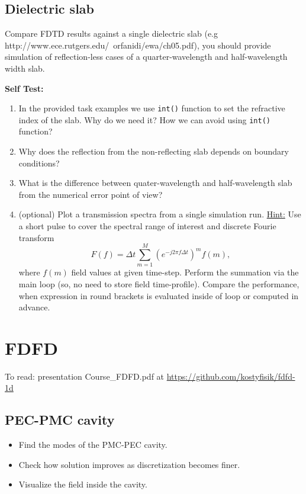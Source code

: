 \documentclass[11pt]{article}
\begin{document}
\subsection{Dielectric slab}

Compare FDTD results against a single dielectric slab (e.g
http://www.ece.rutgers.edu/~orfanidi/ewa/ch05.pdf), you should provide
simulation of reflection-less cases of a quarter-wavelength and
half-wavelength width  slab.

\textbf{Self Test:}
\begin{enumerate}
\item In the provided task examples we use \verb+int()+ function to set the
  refractive index of the slab. Why do we need it? How we can avoid
  using \verb+int()+ function?
\item Why does the reflection from the non-reflecting slab depends on
  boundary conditions?
\item What is the difference between quater-wavelength and
  half-wavelength slab from the numerical error point of view?
\item (optional) Plot a transmission spectra from a single simulation run. \underline{Hint:} Use a short pulse to cover the spectral range of interest and discrete Fourie transform $$F(f) = \Delta t \sum_{m=1}^M \left(e^{-j 2 \pi f \Delta t}\right)^m f(m),$$ where $f(m)$ field values at given time-step. Perform the summation via the main loop (so, no need to store field time-profile). Compare the performance, when expression in round brackets is evaluated inside of loop or computed in advance.
\end{enumerate}

\section{FDFD}

To read: presentation Course\_FDFD.pdf at \url{https://github.com/kostyfisik/fdfd-1d}

\subsection{PEC-PMC cavity}
\label{sec:pec-pmc-cavity}
\begin{itemize}
\item Find the modes of the PMC-PEC cavity.
\item Check how solution improves as discretization becomes finer.
\item Visualize the field inside the cavity.
\end{itemize}
\end{document}
